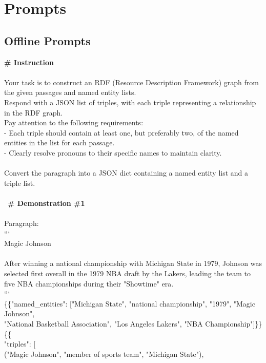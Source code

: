 \clearpage
\onecolumn  %
\section{Prompts}
\label{appendix_sec:agent_prompts}

\subsection{Offline Prompts}
\label{sec:offline_prompts}
\begin{prompt}[title={Reader}]
 \textbf{\# Instruction} \\
\\
Your task is to construct an RDF (Resource Description Framework) graph from the given passages and named entity lists. \\
Respond with a JSON list of triples, with each triple representing a relationship in the RDF graph. \\
Pay attention to the following requirements: \\
- Each triple should contain at least one, but preferably two, of the named entities in the list for each passage. \\
- Clearly resolve pronouns to their specific names to maintain clarity. \\
\\
Convert the paragraph into a JSON dict containing a named entity list and a triple list. \\
\\
\ \textbf{\# Demonstration \#1} \\
\\
Paragraph: \\
``` \\
Magic Johnson \\
\\
After winning a national championship with Michigan State in 1979, Johnson was selected first overall in the 1979 NBA draft by the Lakers, leading the team to five NBA championships during their "Showtime" era. \\
``` \\
\{\{"named\_entities": ["Michigan State", "national championship", "1979", "Magic Johnson", \\ "National Basketball Association", "Los Angeles Lakers", "NBA Championship"]\}\} \\
\{\{ \\
    "triples": [ \\
        ("Magic Johnson", "member of sports team", "Michigan State"), \\

\end{prompt}
